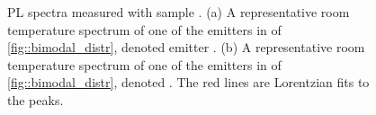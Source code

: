 	\begin{figure}
		\begin{subfigure}[tp]{0.45\linewidth}
			\caption{}\label{subfig::emnarrow}
			\centering
		\end{subfigure}
		\hfill
		\begin{subfigure}[tp]{0.45\linewidth}
			\caption{}\label{subfig::embroad}
			\centering
		\end{subfigure}
		\caption{PL spectra measured with sample \insituHao. (a) A representative room temperature spectrum of one of the emitters in \gh of \autoref{fig::bimodal_distr}, denoted emitter \emnarrow. (b) A representative room temperature spectrum of one of the emitters in \gv of \autoref{fig::bimodal_distr}, denoted \embroad. The red lines are Lorentzian fits to the peaks.}
		\label{fig::spectra}
	\end{figure}

